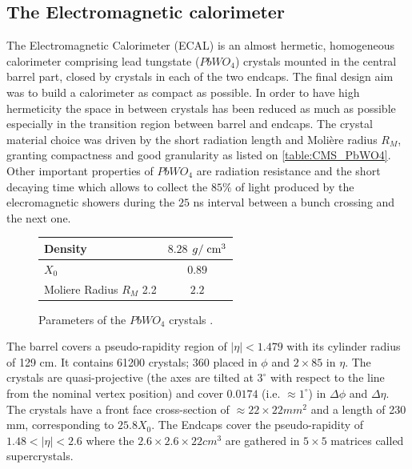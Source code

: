 \clearpage

\subsection{The Electromagnetic calorimeter}

The Electromagnetic Calorimeter (ECAL) is an almost hermetic, homogeneous calorimeter comprising lead tungstate ($PbWO_{4}$) crystals mounted in the central barrel part, closed by crystals in each of the two endcaps. The final design aim was to build a calorimeter as compact as possible. In order to have high hermeticity the space in between crystals has been reduced as much as possible especially in the transition region between barrel and endcaps. 
The crystal material choice was driven by the short radiation length and Molière radius $R_{M}$, granting compactness and good granularity as listed on \autoref{table:CMS_PbWO4}. Other important properties of  $PbWO_{4}$ are radiation resistance and the short decaying time which allows to collect the $85\%$ of light produced by the elecromagnetic showers during the $25$ ns interval between a bunch crossing and the next one.

\begin{figure}[tbh!]
	\begin{center}
		
		\begin{tabular}{ | l | c |}
			\hline
			Density  & $ 8.28$ $g/\;\text{cm}^{3}$ \\ \hline
			$X_{0}$   & $0.89$ \cm \\ \hline
			Moliere Radius $R_{M}$ 2.2 & $2.2$ \cm  \\ \hline
			\hline
		\end{tabular}
		\caption{Parameters of the $PbWO_{4}$ crystals .}
		\label{table:CMS_PbWO4}
	\end{center}
\end{figure}

The barrel covers a pseudo-rapidity region of $|\eta| < 1.479$ with its cylinder radius of 129 cm. It contains 61200 crystals; 360 placed in $\phi$ and $2\times85$ in $\eta$. The crystals are quasi-projective (the axes are tilted at $3^{\circ}$ with respect to the line from the nominal vertex position) and cover $0.0174$ (i.e. $\approx1^{\circ}$) in $\Delta\phi$ and $\Delta\eta$. The crystals have a front face cross-section of $\approx 22\times22 mm^{2}$ and a length of 230 mm, corresponding to $25.8 X_{0}$. The Endcaps cover the pseudo-rapidity of $1.48 < |\eta| < 2.6$ where the $2.6\times2.6\times22 cm^{3}$ are gathered in $5\times5$ matrices called supercrystals.

